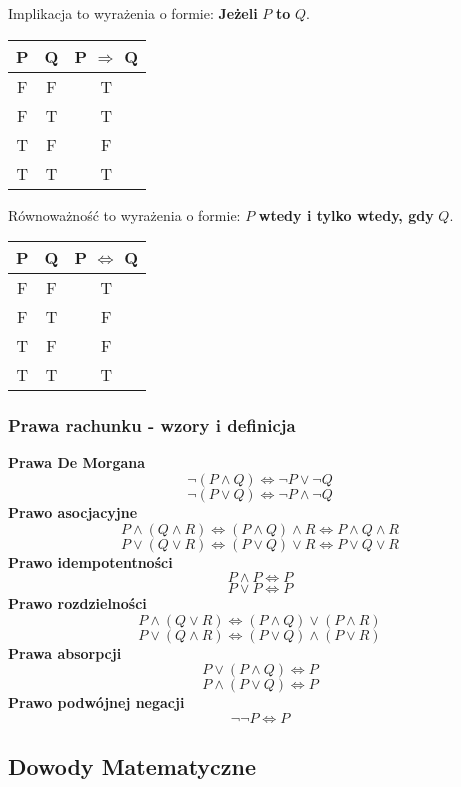 \documentclass[12pt, a4paper]{article}
\begin{document}
Implikacja to wyrażenia o formie: \textbf{Jeżeli} $P$ \textbf{to} $Q$.
\begin{center}
\begin{tabular}{c@{\quad}c@{\quad}c}
\textbf{P} & \textbf{Q} & \textbf{P} $\Rightarrow$ \textbf{Q} \\ \hline
F & F & T \\
F & T & T \\
T & F & F \\
T & T & T \\
\end{tabular}
\end{center}
Równoważność to wyrażenia o formie: $P$ \textbf{wtedy i tylko wtedy, gdy} $Q$.
\begin{center}
\begin{tabular}{c@{\quad}c@{\quad}c}
\textbf{P} & \textbf{Q} & \textbf{P} $\Leftrightarrow$ \textbf{Q} \\ \hline
F & F & T \\
F & T & F \\
T & F & F \\
T & T & T \\
\end{tabular}
\end{center}
\subsubsection*{Prawa rachunku - wzory i definicja}
\textbf{Prawa De Morgana}
$$\neg\left(P \wedge Q\right) \Leftrightarrow \neg P \vee \neg Q$$
$$\neg\left(P \vee Q\right) \Leftrightarrow \neg P \wedge \neg Q$$
\textbf{Prawo asocjacyjne}
$$P \wedge \left(Q \wedge R\right) \Leftrightarrow \left(P \wedge Q\right) \wedge R \Leftrightarrow P \wedge Q \wedge R$$
$$P \vee \left(Q \vee R\right) \Leftrightarrow \left(P \vee Q\right) \vee R \Leftrightarrow P \vee Q \vee R$$
\textbf{Prawo idempotentności}
$$P \wedge P \Leftrightarrow P$$
$$P \vee P \Leftrightarrow P$$
\textbf{Prawo rozdzielności}
$$P \wedge \left(Q \vee R\right) \Leftrightarrow \left(P \wedge Q\right) \vee \left(P \wedge R\right)$$
$$P \vee \left(Q \wedge R\right) \Leftrightarrow \left(P \vee Q\right) \wedge \left(P \vee R\right)$$
\textbf{Prawa absorpcji}
$$P \vee \left(P \wedge Q\right) \Leftrightarrow P$$
$$P \wedge \left(P \vee Q\right) \Leftrightarrow P$$
\textbf{Prawo podwójnej negacji}
$$\neg\neg P \Leftrightarrow P$$
\subsection*{Dowody Matematyczne}
\end{document}
